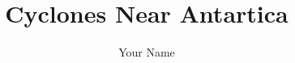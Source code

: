 \documentclass[11pt]{article}
\title{Cyclones Near Antartica}
\author{
  Your Name
}
\begin{document}
\maketitle

\abstract{}



\end{document}
